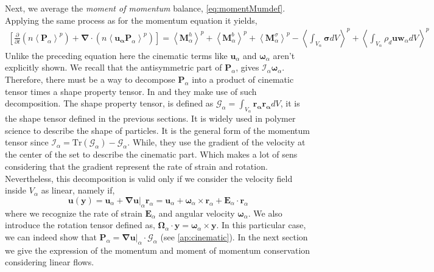 Next, we average the \textit{moment of momentum} balance, \ref{eq:momentMumdef}. 
Applying the same process as for the momentum equation it yields, 
\begin{multline}
    \left[
        \frac{\partial }{\partial t}(n\left<\bm{P}_\alpha\right>^p) 
    + \bm{\nabla}\cdot(n\left<\bm{u_\alpha}\bm{P}_\alpha\right>^p)
    \right] 
    = \left<\bm{M}_\alpha^{h}\right>^p
    + \left< \bm{M}_\alpha^{b}\right>^p
    + \left< \bm{M}_\alpha^{\sigma}\right>^p
    - \left< \int_{V_\alpha} \bm{\sigma} dV\right>^p
    + \left< \int_{V_\alpha}\rho_d \bm{u}\bm{w}_\alpha dV\right>^p
    \label{eq:avgmoment}
\end{multline} 
Unlike the preceding equation here the cinematic terms like $\bm{u}_\alpha$ and $\bm{\omega}_\alpha$ aren't explicitly shown. 
We recall that the antisymmetric part of $\bm{P}_\alpha$, gives $\mathcal{I}_\alpha \bm{\omega}_\alpha$.
Therefore, there must be a way to decompose $\bm{P}_\alpha$ into a product of cinematic tensor times a shape property tensor. 
In \citet{willen2019resolved} and \citet{Pumir2013} they make use of such decomposition. 
The shape property tensor, is defined as $\mathcal{G}_\alpha = \int_{V_\alpha} \bm{\bm{r}_\alpha}\bm{\bm{r}_\alpha} dV$, it is the shape tensor defined in the previous sections.
It is widely used in polymer science to describe the shape of particles. 
It is the general form of the momentum tensor since $\mathcal{I}_\alpha = \text{Tr}(\mathcal{G}_\alpha)-\mathcal{G}_\alpha$. 
While, they use the gradient of the velocity at the center of the set to describe the cinematic part. 
Which makes a lot of sens considering that the gradient represent the rate of strain and rotation. 
Nevertheless, this decomposition is valid only if we consider the velocity field inside $V_\alpha$ as linear, namely if,
\begin{equation}
    \bm{u}(\bm{y}) 
    = 
    \bm{u}_\alpha 
    + \bm{\nabla u}|_\alpha \bm{r}_\alpha
    = 
    \bm{u}_\alpha 
    + \bm{\omega}_\alpha \times \bm{r}_\alpha
    + \bm{E}_\alpha \cdot \bm{r}_\alpha
    \label{eq:lindep}
\end{equation} 
where we recognize the rate of strain $\bm{E}_\alpha$ and angular velocity $\bm{\omega}_\alpha$.
We also introduce the rotation tensor defined as,  $\bm{\Omega}_\alpha \cdot \bm{y} = \bm{\omega}_\alpha \times \bm{y}$.
In this particular case, we can indeed show that $\bm{P}_\alpha = \bm{\nabla u}|_\alpha \cdot \mathcal{G}_\alpha$ (see \ref{ap:cinematic}).
In the next section we give the expression of the momentum and moment of momentum conservation considering linear flows.


